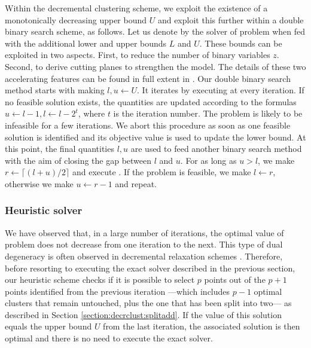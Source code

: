 \documentclass[ijoo,nonblindrev]{informs-ijoo}
\begin{document}
Within the decremental clustering scheme, we exploit the existence of a monotonically decreasing upper bound $U$ and exploit this further within a double binary search scheme, as follows. Let us denote by  the solver of problem  when fed with the additional lower and upper bounds $L$ and $U$. These bounds can be exploited in two aspects. First, to reduce the number of binary variables $z$. Second, to derive cutting planes to strengthen the model. The details of these two accelerating features can be found in full extent in \citet{Sayah2017new}. Our double binary search method starts with making $l, u \leftarrow U$. It iterates by executing  at every iteration. If no feasible solution exists, the quantities are updated according to the formulas $u \leftarrow l - 1, l\leftarrow l - 2^t$, where $t$ is the iteration number. The problem  is likely to be infeasible for a few iterations. We abort this procedure as soon as one feasible solution is identified and its objective value is used to update the lower bound. At this point, the final quantities $l, u$ are used to feed another binary search method with the aim of closing the gap between $l$ and $u$. For as long as $u > l$, we make $r\leftarrow \lceil (l + u) / 2\rceil$ and execute . If the problem is feasible, we make $l\leftarrow r$, otherwise we make $u\leftarrow r - 1$ and repeat.

\subsubsection{Heuristic solver}

We have observed that, in a large number of iterations, the optimal value of problem  does not decrease from one iteration to the next. This type of dual degeneracy is often observed in decremental relaxation schemes \citep{Aloise2018sampling, Contardo2019scalable}. Therefore, before resorting to executing the exact solver described in the previous section, our heuristic scheme checks if it is possible to select $p$ points out of the $p + 1$ points identified from the previous iteration ---which includes $p - 1$ optimal clusters that remain untouched, plus the one that has been split into two--- as described in Section \ref{section:decrclust:splitadd}. If the value of this solution equals the upper bound $U$ from the last iteration, the associated solution is then optimal and there is no need to execute the exact solver.
\end{document}
